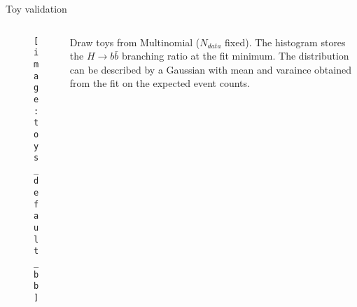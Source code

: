 \begin{block}{Toy validation}
\begin{columns}
\begin{column}{.3\textwidth}
    \begin{figure}
        \centering\texttt{[image: toys\_default\_bb]}
    \end{figure}
\end{column}
\begin{column}{.7\textwidth}
    Draw toys from Multinomial ($N_{data}$ fixed).
    The histogram stores the $H\to b\bar{b}$ branching ratio at the fit minimum.
    The distribution can be described by a Gaussian with
    mean and varaince obtained from the fit on the expected event counts.
\end{column}
\end{columns}
\end{block}
